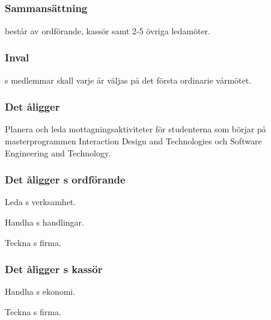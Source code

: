 \subsection{\MRCITFULL}
\subsubsection{Sammansättning}
\MRCIT{} består av ordförande, kassör samt 2-5 övriga ledamöter.

\subsubsection{Inval}
\MRCIT{}s medlemmar skall varje år väljas på det första ordinarie vårmötet.

\subsubsection{Det åligger \MRCIT}
\begin{att}
  \item Planera och leda mottagningsaktiviteter för studenterna som börjar på masterprogrammen Interaction Design and Technologies och Software Engineering and Technology.
\end{att}

\subsubsection{Det åligger \MRCIT{}s ordförande}
\begin{att}
  \item Leda \MRCIT{}s verksamhet.
  \item Handha \MRCIT{}s handlingar.
  \item Teckna \MRCIT{}s firma.
\end{att}

\subsubsection{Det åligger \MRCIT{}s kassör}
\begin{att}
  \item Handha \MRCIT{}s ekonomi.
  \item Teckna \MRCIT{}s firma.
\end{att}